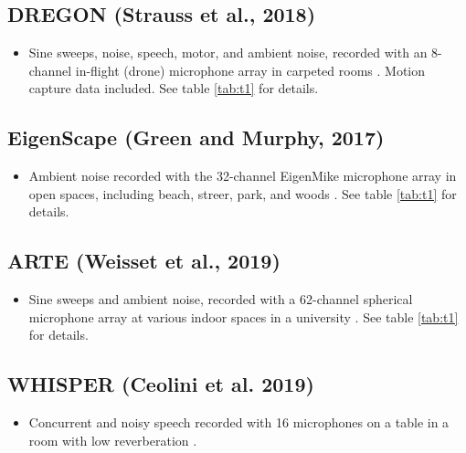 \documentclass[14pt, legalpaper]{extarticle}
\begin{document}
\subsection{DREGON (Strauss et al., 2018)}

\begin{itemize}

\item Sine sweeps, noise, speech, motor, and ambient noise, recorded with an 8-channel in-flight (drone) microphone array in carpeted rooms \cite{strauss2018dregon}. Motion capture data included. See table \ref{tab:t1} for details.

\end{itemize}

\subsection{EigenScape (Green and Murphy, 2017)}

\begin{itemize}

\item Ambient noise recorded with the 32-channel EigenMike microphone array in open spaces, including beach, streer, park, and woods \cite{green2017eigenscape}. See table \ref{tab:t1} for details.

\end{itemize}

\subsection{ARTE (Weisset et al., 2019)}

\begin{itemize}

\item Sine sweeps and ambient noise, recorded with a 62-channel spherical microphone array at various indoor spaces in a university \cite{weisser2019ambisonic}. See table \ref{tab:t1} for details.

\end{itemize}

\subsection{WHISPER (Ceolini et al. 2019)}

\begin{itemize}

\item Concurrent and noisy speech recorded with 16 microphones on a table in a room with low reverberation \cite{ceolini2020evaluating}.

\end{itemize}
\end{document}
